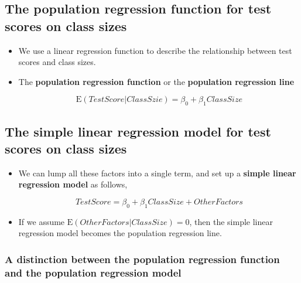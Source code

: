 \documentclass[11pt]{article}
\begin{document}
\subsection*{The population regression function for test scores on class sizes}
\label{sec:orgf59d18d}

\begin{itemize}
\item We use a linear regression function to describe the relationship
between test scores and class sizes.

\item The \textbf{population regression function} or the \textbf{population regression
line}

\begin{equation}
\label{eq:popreg-testscore}
\mathrm{E}(TestScore | ClassSzie) = \beta_0 + \beta_1 ClassSize
\end{equation}
\end{itemize}

\subsection*{The simple linear regression model for test scores on class sizes}
\label{sec:orgc7b4926}

\begin{itemize}
\item We can lump all these factors into a single term, and set up a \textbf{simple linear
regression model} as follows,

\begin{equation}
\label{eq:regmodel-testscore}
TestScore = \beta_0 + \beta_1 ClassSize + OtherFactors
\end{equation}

\item If we assume \(\mathrm{E}(OtherFactors | ClassSize) = 0\), then the
simple linear regression model becomes the population regression line.
\end{itemize}

\subsubsection*{A distinction between the population regression function and the population regression model}
\label{sec:orgb18115d}
\end{document}
